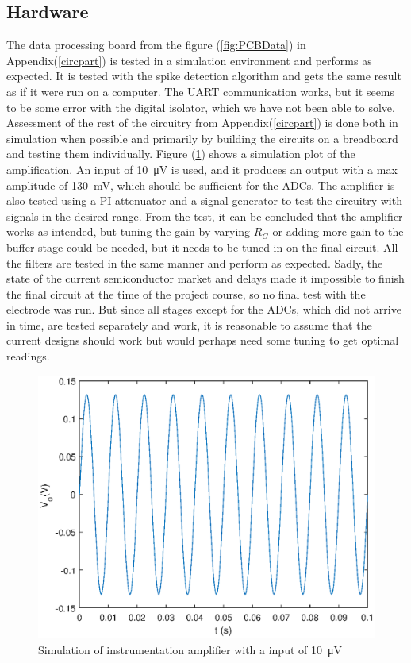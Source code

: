 \subsection{Hardware}
The data processing board from the figure (\ref{fig:PCBData}) in Appendix(\ref{circpart}) is tested in a simulation environment and performs as expected. It is tested with the spike detection algorithm and gets the same result as if it were run on a computer. The UART communication works, but it seems to be some error with the digital isolator, which we have not been able to solve. Assessment of the rest of the circuitry from Appendix(\ref{circpart}) is done both in simulation when possible and primarily by building the circuits on a breadboard and testing them individually. Figure (\ref{fig:ampsim}) shows a simulation plot of the amplification. An input of \SI{10}{\micro\volt} is used, and it produces an output with a max amplitude of \SI{130}{\milli\volt}, which should be sufficient for the ADCs. The amplifier is also tested using a PI-attenuator and a signal generator to test the circuitry with signals in the desired range. From the test, it can be concluded that the amplifier works as intended, but tuning the gain by varying $R_G$ or adding more gain to the buffer stage could be needed, but it needs to be tuned in on the final circuit. All the filters are tested in the same manner and perform as expected. Sadly, the state of the current semiconductor market and delays made it impossible to finish the final circuit at the time of the project course, so no final test with the electrode was run. But since all stages except for the ADCs, which did not arrive in time, are tested separately and work, it is reasonable to assume that the current designs should work but would perhaps need some tuning to get optimal readings.
\begin{figure} [H]
\begin{center}
\includegraphics[scale=0.8]{images/Ampout.eps}
   \caption{Simulation of instrumentation amplifier with a input of \SI{10}{\micro\volt}}
    \label{fig:ampsim}
\end{center}
\end{figure}


